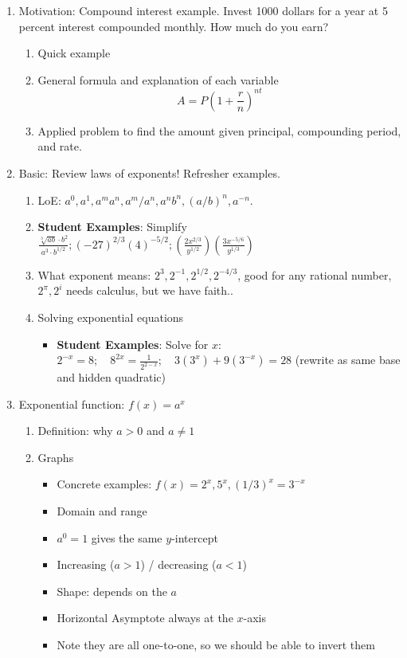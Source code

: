 \documentclass{article}
\newcommand{\ds}{\displaystyle}
\begin{document}
\begin{enumerate}

\item Motivation: Compound interest example. Invest 1000 dollars for a year at 5 percent interest compounded monthly. How much do you earn?
\begin{enumerate}
\item Quick example
\item General formula and explanation of each variable
\[
A = P\left(1+\frac{r}{n}\right)^{nt}
\]
\item Applied problem to find the amount given principal, compounding period, and rate. 
\end{enumerate}


\item Basic: Review laws of exponents! Refresher examples. \\
\begin{enumerate}
\item LoE: $a^0, a^1, a^ma^n, a^m/a^n, a^nb^n, (a/b)^n, a^{-n}$. 
\item {\bf Student Examples}: Simplify $\ds \frac{\sqrt[3]{ab}\cdot b^2}{a^3\cdot b^{1/2}}; (-27)^{2/3}(4)^{-5/2}; \left( \frac{2x^{2/3}}{y^{1/2}}\right)\left( \frac{3x^{-5/6}}{y^{1/3}}\right)$
\item What exponent means: $2^3, 2^{-1}, 2^{1/2}, 2^{-4/3}$, good for any rational number, $2^\pi, 2^i$ needs calculus, but we have faith..
\item Solving exponential equations
\begin{itemize}
\item {\bf Student Examples}: Solve for $x$: $\ds 2^{-x}=8; \quad 8^{2x}=\frac{1}{2^{2-x}}; \quad 3(3^x)+9(3^{-x})=28$ (rewrite as same base and hidden quadratic)
\end{itemize}
\end{enumerate}


\item Exponential function: $f(x) = a^x$
\begin{enumerate}
\item Definition: why $a>0$ and $a\neq1$
\item Graphs
\begin{itemize}
\item Concrete examples: $f(x)=2^x, 5^x, (1/3)^x=3^{-x}$
\item Domain and range
\item $a^0 = 1$ gives the same $y$-intercept
\item Increasing ($a>1$) / decreasing ($a<1$)
\item Shape: depends on the $a$
\item Horizontal Asymptote always at the $x$-axis
\item Note they are all one-to-one, so we should be able to invert them
\end{itemize}
\end{enumerate}


\end{enumerate}
\end{document}
